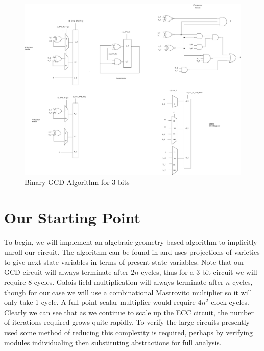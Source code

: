 \documentclass[12pt]{report}
\begin{document}
\begin{figure}
\includegraphics[scale=0.35]{images/gcd_page.png}
\caption{Binary GCD Algorithm for $3$ bits}
\label{fig:gcd}
\end{figure}

\section{Our Starting Point}

To begin, we will implement an algebraic geometry based algorithm to implicitly unroll our circuit. The algorithm can be found in \cite{Kalla} and uses projections of varieties to give next state variables in terms of present state variables. Note that our GCD circuit will always terminate after $2n$ cycles, thus for a 3-bit circuit we will require 8 cycles. Galois field multiplication will always terminate after $n$ cycles, though for our case we will use a combinational Mastrovito multiplier so it will only take 1 cycle. A full point-scalar multiplier would require $4n^2$ clock cycles. Clearly we can see that as we continue to scale up the ECC circuit, the number of iterations required grows quite rapidly. To verify the large circuits presently used some method of reducing this complexity is required, perhaps by verifying modules individualing then substituting abstractions for full analysis. 
\end{document}
